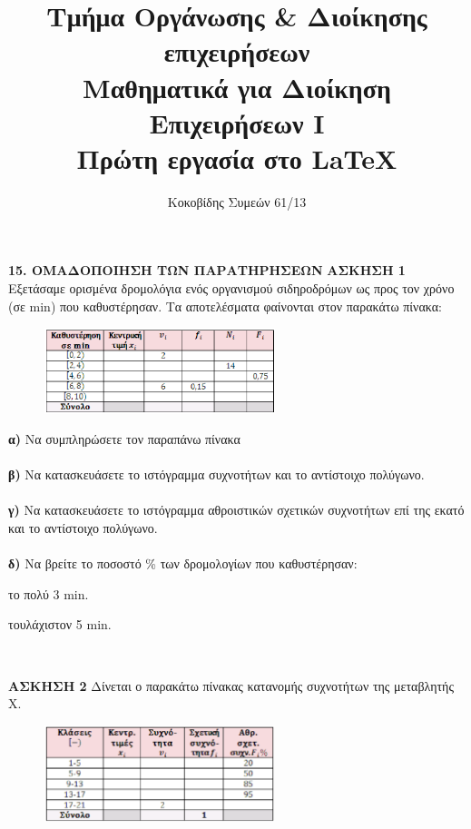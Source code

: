 \documentclass[11pt,a4paper]{article}
\author{Κοκοβίδης Συμεών 61/13}
\title{ Τμήμα Οργάνωσης \& Διοίκησης επιχειρήσεων \\ Μαθηματικά για Διοίκηση Επιχειρήσεων Ι \\ Πρώτη εργασία στο \LaTeX}
\begin{document}
\maketitle
\onehalfspacing

\textbf{15. ΟΜΑΔΟΠΟΙΗΣΗ ΤΩΝ ΠΑΡΑΤΗΡΗΣΕΩΝ } \newline 
\textbf{ΑΣΚΗΣΗ 1} Εξετάσαμε ορισμένα δρομολόγια ενός οργανισμού σιδηροδρόμων ως προς τον χρόνο (σε \textlatin {min}) που καθυστέρησαν. Τα αποτελέσματα φαίνονται στον παρακάτω πίνακα:


\begin{figure}[hbtp]
\begin{center}
\includegraphics[width=0.6\textwidth, scale=0.5]{1.eps}
\end{center}
\end{figure}


\textbf{α)} Να συμπληρώσετε τον παραπάνω πίνακα  \\
\\
\textbf{β)} Να κατασκευάσετε  το ιστόγραμμα συχνοτήτων και το αντίστοιχο πολύγωνο. \\
\\
\textbf{γ)} Να κατασκευάσετε το ιστόγραμμα αθροιστικών σχετικών συχνοτήτων επί της εκατό και το αντίστοιχο πολύγωνο.\\
\\
\textbf{δ)} Να βρείτε το ποσοστό \% των δρομολογίων που καθυστέρησαν:

\begin{inparaenum}[i.]\itemsep2pt
\item   το πολύ 3 \textlatin{min}.
\item τουλάχιστον 5 \textlatin{min}.
\end{inparaenum}\\

\newpage 

\textbf {ΑΣΚΗΣΗ 2}  Δίνεται ο παρακάτω πίνακας κατανομής συχνοτήτων της μεταβλητής Χ.\\

\begin{figure}[hbtp]
\begin{center}
\includegraphics[width=0.6\textwidth, scale=0.5]{2.eps}
\end{center}
\end{figure}
\end{document}
